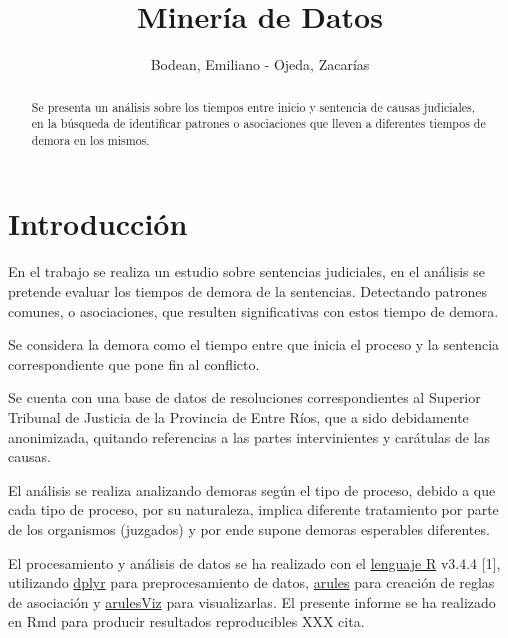 \documentclass[runningheads,a4paper]{llncs}
\begin{document}
\title{Minería de Datos}


\author{Bodean, Emiliano - Ojeda, Zacarías}




%
\iffalse
\authorinfo{
  
}{
}{
  \{\}
}
\fi


\maketitle


	\begin{abstract}
		Se presenta un análisis sobre los tiempos entre inicio y sentencia de
causas judiciales, en la búsqueda de identificar patrones o asociaciones
que lleven a diferentes tiempos de demora en los mismos.
	\end{abstract}


\section{Introducción}\label{introduccion}

En el trabajo se realiza un estudio sobre sentencias judiciales, en el
análisis se pretende evaluar los tiempos de demora de la sentencias.
Detectando patrones comunes, o asociaciones, que resulten significativas
con estos tiempo de demora.

Se considera la demora como el tiempo entre que inicia el proceso y la
sentencia correspondiente que pone fin al conflicto.

Se cuenta con una base de datos de resoluciones correspondientes al
Superior Tribunal de Justicia de la Provincia de Entre Ríos, que a sido
debidamente anonimizada, quitando referencias a las partes
intervinientes y carátulas de las causas.

El análisis se realiza analizando demoras según el tipo de proceso,
debido a que cada tipo de proceso, por su naturaleza, implica diferente
tratamiento por parte de los organismos (juzgados) y por ende supone
demoras esperables diferentes.

El procesamiento y análisis de datos se ha realizado con el
\href{https://www.r-project.org}{lenguaje R} v3.4.4 {[}1{]}, utilizando
\href{}{dplyr} para preprocesamiento de datos, \href{}{arules} para
creación de reglas de asociación y \href{}{arulesViz} para
visualizarlas. El presente informe se ha realizado en Rmd para producir
resultados reproducibles XXX cita.
\end{document}
